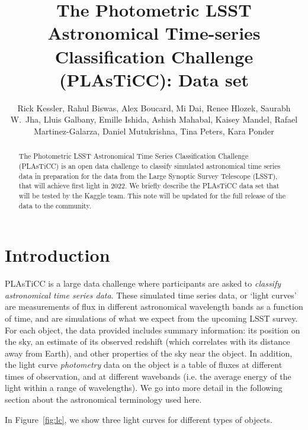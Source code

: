 \documentclass[\docopts]{\docclass}
\author{Rick Kessler,  Rahul Biswas, Alex Boucard, Mi Dai, Renee Hlozek,
Saurabh W.~Jha, Lluis Galbany, Emille Ishida, Ashish Mahabal, Kaisey Mandel, Rafael Martinez-Galarza, Daniel Mutukrishna, Tina Peters, Kara Ponder}
\begin{document}
\title{The Photometric LSST Astronomical Time-series Classification Challenge (PLAsTiCC): Data set}


\begin{abstract}
The Photometric LSST Astronomical Time Series Classification Challenge (PLAsTiCC) is an open data challenge to classify simulated astronomical time series data in preparation for the data from the Large Synoptic Survey Telescope (LSST), that will achieve first light in 2022. We briefly describe the PLAsTiCC data set that will be tested by the Kaggle team. This note will be updated for the full release of the data to the community.

\end{abstract}

\dockeys{}

\maketitlepost


\section{Introduction}
\label{sec:intro}
PLAsTiCC is a large data challenge where participants are asked to \textit{classify astronomical time series data}. These simulated time series data, or `light curves' are measurements of flux in different astronomical wavelength bands as a function of time, and are simulations of what we expect from the upcoming LSST survey. For each object, the data provided includes summary information: its position on the sky, an estimate of its observed redshift (which correlates with its distance away from Earth), and other properties of the sky near the object. In addition, the light curve \textit{photometry} data on the object is a table of fluxes at different times of observation, and at different wavebands (i.e. the average energy of the light within a range of wavelengths). We go into more detail in the following section about the astronomical terminology used here.

In Figure~\ref{fig:lc}, we show three light curves for different types of objects.
\end{document}

